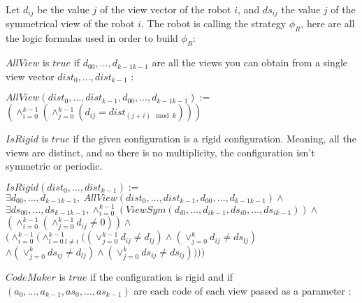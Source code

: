 \documentclass{article}
\begin{document}
Let $d_{ij}$ be the value $j$ of the view vector of the robot $i$, and $ds_{ij}$ the value $j$ of the symmetrical 
view of the robot $i$.
The robot is calling the strategy $\phi_R$, here are all the logic formulas used in order to build $\phi_R$:

$AllView$ is $true$ if $d_{00}, \ldots ,d_{k-1k-1}$ are all the views you can obtain from a single view vector $dist_{0}, \ldots ,dist_{k-1}$ :

\begin{center}
    
$AllView(dist_{0}, \ldots ,dist_{k-1}, d_{00}, \ldots ,d_{k-1k-1}):=$\\
$(\land_{i=0}^{k-1} (\land_{j=0}^{k-1} (d_{ij} = dist_{(j+i) \mod{k}}) ) )$
\end{center}

$IsRigid$ is $true$ if the given configuration is a rigid configuration. Meaning, all the views are distinct, and so there is no multiplicity, the configuration isn't symmetric or periodic.

\begin{center}

$IsRigid(dist_{0}, \ldots ,dist_{k-1}):=$\\
$\exists d_{00}, \ldots ,d_{k-1k-1},\ AllView(dist_{0}, \ldots ,dist_{k-1}, d_{00}, \ldots ,d_{k-1k-1})\land$\\
$\exists ds_{00}, \ldots ,ds_{k-1k-1}, \land_{i=0}^{k-1} (ViewSym(d_{i0}, \ldots , d_{ik-1}, ds_{i0}, \ldots , ds_{ik-1}))\land$\\
$(\land_{i=0}^{k-1}(\land_{j=0}^{k-1}d_{ij}\not=0))\land $\\%
$( \land_{i=0}^{k-1}(
\land_{l=0\ l\not=i}^{k-1}(
(\lor_{j=0}^{k-1}d_{ij} \not= d_{lj})
\land (\lor_{j=0}^{k}d_{ij} \not= ds_{lj})$\\
$\land (\lor_{j=0}^{k}ds_{ij} \not= d_{lj})
\land (\lor_{j=0}^{k}ds_{ij} \not= ds_{lj})
) ))$\\%
\end{center}

$CodeMaker$ is $true$ if the configuration is rigid and if $(a_{0}, \ldots , a_{k-1}, as_{0}, \ldots , as_{k-1})$ are each code of each view passed as a parameter :
\end{document}
